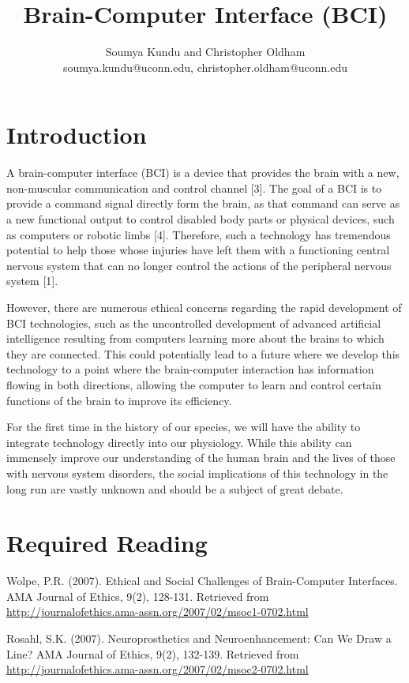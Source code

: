\documentclass[12pt]{article}
\title{\textbf{Brain-Computer Interface (BCI)}}
\author{Soumya Kundu and Christopher Oldham \vspace{0.1in} \\ soumya.kundu@uconn.edu, christopher.oldham@uconn.edu}
\date{}
\begin{document}
\maketitle
\vspace{-0.3in}

\section*{Introduction}

A brain-computer interface (BCI) is a device that provides the brain with a new, non-muscular communication and control channel [3]. The goal of a BCI is to provide a command signal directly form the brain, as that command can serve as a new functional output to control disabled body parts or physical devices, such as computers or robotic limbs [4]. Therefore, such a technology has tremendous potential to help those whose injuries have left them with a functioning central nervous system that can no longer control the actions of the peripheral nervous system [1].

However, there are numerous ethical concerns regarding the rapid development of BCI technologies, such as the uncontrolled development of advanced artificial intelligence resulting from computers learning more about the brains to which they are connected. This could potentially lead to a future where we develop this technology to a point where the brain-computer interaction has information flowing in both directions, allowing the computer to learn and control certain functions of the brain to improve its efficiency.

For the first time in the history of our species, we will have the ability to integrate technology directly into our physiology. While this ability can immensely improve our understanding of the human brain and the lives of those with nervous system disorders, the social implications of this technology in the long run are vastly unknown and should be a subject of great debate.

\section*{Required Reading}

\begin{enumerate}[leftmargin=0.6cm, label={[\arabic*]}]

\item Wolpe, P.R. (2007). Ethical and Social Challenges of Brain-Computer Interfaces. AMA Journal of Ethics, 9(2), 128-131. Retrieved from \url{http://journalofethics.ama-assn.org/2007/02/msoc1-0702.html}

\item Rosahl, S.K. (2007). Neuroprosthetics and Neuroenhancement: Can We Draw a Line? AMA Journal of Ethics, 9(2), 132-139. Retrieved from \url{http://journalofethics.ama-assn.org/2007/02/msoc2-0702.html}

\end{enumerate}
\end{document}
